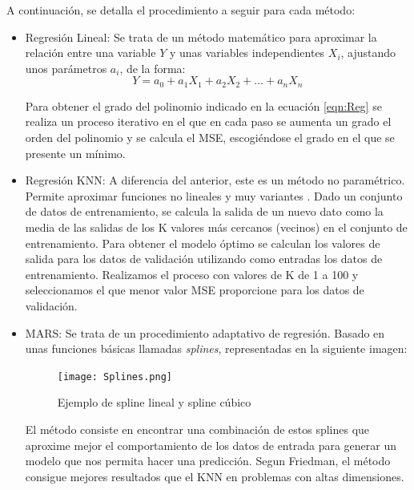 \documentclass[journal]{IEEEtran}
\begin{document}
A continuación, se detalla el procedimiento a seguir para cada método:
\begin{itemize}
    \item Regresión Lineal: Se trata de un método matemático para aproximar la relación entre una variable $Y$ y unas variables independientes $X_i$, ajustando unos parámetros $a_i$, de la forma:
\begin{equation}
\label{eqn:Reg}
 Y = a_0+a_1X_1 + a_2X_2+\ldots + a_nX_n
\end{equation}

 Para obtener el grado del polinomio indicado en la ecuación \ref{eqn:Reg} se realiza un proceso iterativo en el que en cada paso se aumenta un grado el orden del polinomio y se calcula el MSE, escogiéndose el grado en el que se presente un mínimo. 

    \item Regresión KNN: A diferencia del anterior, este es un método no paramétrico. Permite aproximar funciones no lineales y muy variantes \cite{James2013}. Dado un conjunto de datos de entrenamiento, se calcula la salida de un nuevo dato como la media de las salidas de los K valores más cercanos (vecinos) en el conjunto de entrenamiento.
    Para obtener el modelo óptimo se calculan los valores de salida para los datos de validación utilizando como entradas los datos de entrenamiento. Realizamos el proceso con valores de K de 1 a 100 y seleccionamos el que menor valor MSE proporcione para los datos de validación.

    \item MARS: Se trata de un procedimiento adaptativo de regresión. Basado en unas funciones básicas llamadas \emph{splines}, representadas en la siguiente imagen: 
    \begin{figure}[!ht]
        \centering
        \texttt{[image: Splines.png]}
        \captionsetup{justification=centering,singlelinecheck=false}
        \caption{Ejemplo de spline lineal y spline cúbico}
        \label{fig:splines}
    \end{figure}
    El método consiste en encontrar una combinación de estos splines que aproxime mejor el comportamiento de los datos de entrada para generar un modelo que nos permita hacer una predicción. Segun Friedman, \cite{JHFRIEDMAN1991} el método consigue mejores resultados que el KNN en problemas con altas dimensiones.
     

\end{itemize}
\end{document}
